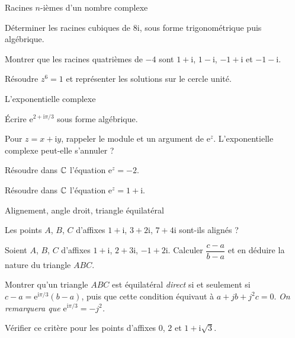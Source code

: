 \begin{exercice}[2]{Racines $n$-ièmes d'un nombre complexe}
\begin{questions}
  \item Déterminer les racines cubiques de $8\mathrm{i}$, sous forme
    trigonométrique puis algébrique.
  \item Montrer que les racines quatrièmes de $-4$ sont
    $1+\mathrm{i}$, $1-\mathrm{i}$, $-1+\mathrm{i}$ et $-1-\mathrm{i}$.
  \item Résoudre $z^{6}=1$ et représenter les solutions sur le cercle unité.
\end{questions}
\end{exercice}

\begin{exercice}[2]{L'exponentielle complexe}
\begin{questions}
  \item Écrire $\mathrm{e}^{2+\mathrm{i}\pi/3}$ sous forme algébrique.
  \item Pour $z=x+\mathrm{i}y$, rappeler le module et un argument de $\mathrm{e}^{z}$.
    L'exponentielle complexe peut-elle s'annuler ?
  \item Résoudre dans $\mathbb{C}$ l'équation $\mathrm{e}^{z}=-2$.
  \item Résoudre dans $\mathbb{C}$ l'équation $\mathrm{e}^{z}=1+\mathrm{i}$.
\end{questions}
\end{exercice}


\begin{exercice}[3]{Alignement, angle droit, triangle équilatéral}
\begin{questions}
  \item Les points $A$, $B$, $C$ d'affixes $1+\mathrm{i}$, $3+2\mathrm{i}$,
    $7+4\mathrm{i}$ sont-ils alignés ?
  \item Soient $A$, $B$, $C$ d'affixes $1+\mathrm{i}$, $2+3\mathrm{i}$,
    $-1+2\mathrm{i}$. Calculer $\dfrac{c-a}{b-a}$ et en déduire la nature du
    triangle $ABC$.
  \item Montrer qu'un triangle $ABC$ est équilatéral \emph{direct} si et
    seulement si $c-a=\mathrm{e}^{\mathrm{i}\pi/3}(b-a)$, puis que cette
    condition équivaut à $a+jb+j^{2}c=0$.
    \emph{On remarquera que $\mathrm{e}^{\mathrm{i}\pi/3}=-j^{2}$.}
  \item Vérifier ce critère pour les points d'affixes $0$, $2$ et $1+\mathrm{i}\sqrt3$.
\end{questions}
\end{exercice}

